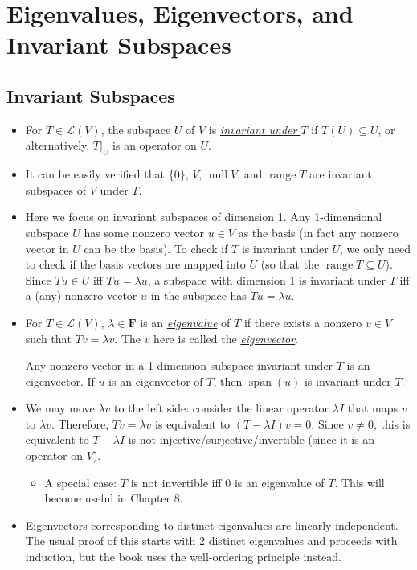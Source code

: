 \documentclass[11pt]{article}
\newcommand{\df}[1]{\ul{\textit{\textsf{#1}}}}
\newcommand{\F}{\mathbf{F}}
\newcommand{\s}{\operatorname{span}}
\newcommand{\n}{\operatorname{null}}
\renewcommand{\r}{\operatorname{range}}
\newcommand{\LV}{\mathcal{L}(V)}
\begin{document}
\newpage
\section{Eigenvalues, Eigenvectors, and Invariant Subspaces}
\subsection{Invariant Subspaces}
\begin{itemize}
    \item For $T \in \LV$, the subspace $U$ of $V$ is \df{invariant under $T$} if $T(U) \subseteq U$, or alternatively, $T|_U$ is an operator on $U$.
    \item It can be easily verified that $\{0\}$, $V$, $\n V$, and $\r T$ are invariant subspaces of $V$ under $T$.
    \item Here we focus on invariant subspaces of dimension 1. Any 1-dimensional subspace $U$ has some nonzero vector $u \in V$ as the basis (in fact any nonzero vector in $U$ can be the basis). To check if $T$ is invariant under $U$, we only need to check if the basis vectors are mapped into $U$ (so that the $\r T \subseteq U$). Since $Tu \in U$ iff $Tu = \lambda u$, a subspace with dimension 1 is invariant under $T$ iff a (any) nonzero vector $u$ in the subspace has $Tu = \lambda u$.
    \item For $T \in \LV$, $\lambda \in \F$ is an \df{eigenvalue} of $T$ if there exists a nonzero $v \in V$ such that $Tv = \lambda v$. The $v$ here is called the \df{eigenvector}.
    
    Any nonzero vector in a 1-dimension subspace invariant under $T$ is an eigenvector. If $u$ is an eigenvector of $T$, then $\s(u)$ is invariant under $T$.
    \item We may move $\lambda v$ to the left side: consider the linear operator $\lambda I$ that maps $v$ to $\lambda v$. Therefore, $Tv = \lambda v$ is equivalent to $(T-\lambda I) v = 0$. Since $v \not= 0$, this is equivalent to $T-\lambda I$ is not injective/surjective/invertible (since it is an operator on $V$).
    \begin{itemize}
        \item A special case: $T$ is not invertible iff 0 is an eigenvalue of $T$. This will become useful in Chapter 8.
    \end{itemize}
    \item Eigenvectors corresponding to distinct eigenvalues are linearly independent. The usual proof of this starts with 2 distinct eigenvalues and proceeds with induction, but the book uses the well-ordering principle instead.
    

\end{itemize}
\end{document}
